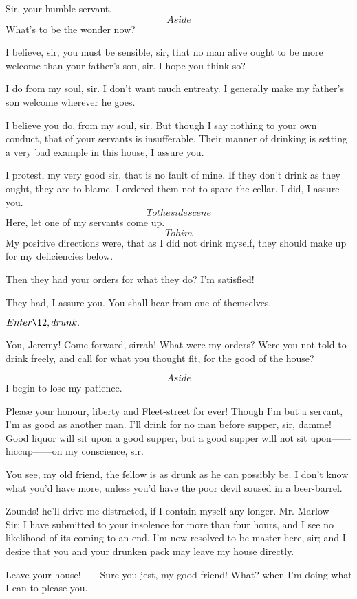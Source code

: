\documentclass{book}
\begin{document}
\2  Sir, your humble servant.  \[Aside\]  What's to be the wonder
now?

\3  I believe, sir, you must be sensible, sir, that no man
alive ought to be more welcome than your father's son, sir.  I hope you
think so?

\2  I do from my soul, sir.  I don't want much entreaty.  I
generally make my father's son welcome wherever he goes.

\3  I believe you do, from my soul, sir.  But though I say
nothing to your own conduct, that of your servants is insufferable. 
Their manner of drinking is setting a very bad example in this house, 
I assure you.

\2  I protest, my very good sir, that is no fault of mine.  If
they don't drink as they ought, they are to blame.  I ordered them not
to spare the cellar.  I did, I assure you.  \[To the side scene\]  Here,
let one of my servants come up.  \[To him\]  My positive directions
were, that as I did not drink myself, they should make up for my
deficiencies below.

\3  Then they had your orders for what they do?  I'm
satisfied!

\2  They had, I assure you.  You shall hear from one of
themselves.


\(Enter \12, drunk.\)


\2  You, Jeremy!  Come forward, sirrah!  What were my orders? 
Were you not told to drink freely, and call for what you thought fit,
for the good of the house?

\3  \[Aside\]  I begin to lose my patience.

 Please your honour, liberty and Fleet-street for ever! 
Though I'm but a servant, I'm as good as another man.  I'll drink for
no man before supper, sir, damme!  Good liquor will sit upon a good
supper, but a good supper will not sit upon------hiccup------on my
conscience, sir.

\2  You see, my old friend, the fellow is as drunk as he can
possibly be.  I don't know what you'd have more, unless you'd have the
poor devil soused in a beer-barrel.

\3  Zounds! he'll drive me distracted, if I contain myself any
longer.  Mr. Marlow---Sir; I have submitted to your insolence for more
than four hours, and I see no likelihood of its coming to an end.  I'm
now resolved to be master here, sir; and I desire that you and your
drunken pack may leave my house directly.

\2  Leave your house!------Sure you jest, my good friend!  What?
when I'm doing what I can to please you.
\end{document}
